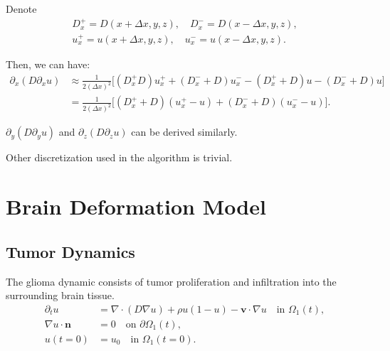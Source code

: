 \documentclass[12pt]{article}
\newcommand{\bn}{\mathbf{n}}
\newcommand{\bu}{\mathbf{u}}
\newcommand{\bv}{\mathbf{v}}
\newcommand{\pp}{\partial}
\begin{document}
Denote
\begin{align*}
D_x^+ = D(x + \Delta x, y, z), \quad D_x^- = D(x - \Delta x, y, z), \\
u_x^+ = u(x + \Delta x, y, z), \quad u_x^- = u(x - \Delta x, y, z).
\end{align*}

Then, we can have:
\begin{align*}
\pp_x (D \pp_x u) & \approx \frac{1}{2( \Delta x )^2} \bigg[ ( D_x^+ D ) u_x^+ + (D_x^- + D) u_x^- - (D_x^+ + D ) u - (D_x^- + D) u \bigg] \\
& = \frac{1}{2( \Delta x )^2} \bigg[ ( D_x^+ + D) (u_x^+ - u) + (D_x^- + D) (u_x^- - u) \bigg].
\end{align*}

$\pp_y (D \pp_y u)$ and $\pp_z (D \pp_z u)$ can be derived similarly.

Other discretization used in the algorithm is trivial.


\section{Brain Deformation Model}

\subsection{Tumor Dynamics}
The glioma dynamic consists of tumor proliferation and infiltration into the surrounding brain tissue.
\begin{align}
    \pp_t u &= \nabla \cdot (D \nabla u) + \rho u (1 - u) - \bv \cdot \nabla u \quad \text{in } \Omega_1(t), \label{eq:tumor-dynamics} \\
    \nabla u \cdot \bn &= 0 \quad \text{on } \partial \Omega_1(t), \label{eq:no-flux} \\
    u(t = 0) &= u_0 \quad \text{in } \Omega_1(t = 0). \label{eq:initial-condition}
\end{align}
\end{document}
